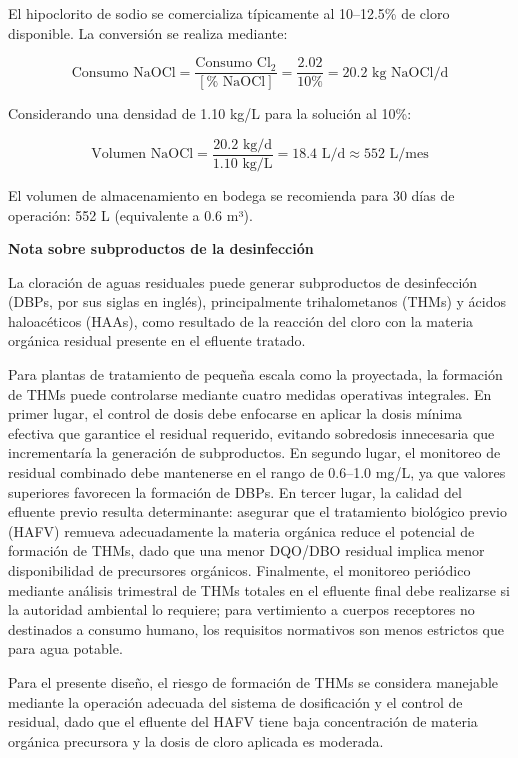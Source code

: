 \documentclass[12pt,a4paper]{article}
\begin{document}
El hipoclorito de sodio se comercializa típicamente al 10--12.5\% de cloro disponible. La conversión se realiza mediante:

\begin{equation}
\text{Consumo NaOCl} = \frac{\text{Consumo Cl}_2}{[\% \text{ NaOCl}]} = \frac{2.02}{10\%} = 20.2 \text{ kg NaOCl/d}
\end{equation}

Considerando una densidad de 1.10 kg/L para la solución al 10\%:

\begin{equation}
\text{Volumen NaOCl} = \frac{20.2 \text{ kg/d}}{1.10 \text{ kg/L}} = 18.4 \text{ L/d} \approx 552 \text{ L/mes}
\end{equation}

El volumen de almacenamiento en bodega se recomienda para 30 días de operación: 552 L (equivalente a 0.6 m³).

\textbf{Nota sobre subproductos de la desinfección}

La cloración de aguas residuales puede generar subproductos de desinfección (DBPs, por sus siglas en inglés), principalmente trihalometanos (THMs) y ácidos haloacéticos (HAAs), como resultado de la reacción del cloro con la materia orgánica residual presente en el efluente tratado.

Para plantas de tratamiento de pequeña escala como la proyectada, la formación de THMs puede controlarse mediante cuatro medidas operativas integrales. En primer lugar, el control de dosis debe enfocarse en aplicar la dosis mínima efectiva que garantice el residual requerido, evitando sobredosis innecesaria que incrementaría la generación de subproductos. En segundo lugar, el monitoreo de residual combinado debe mantenerse en el rango de 0.6--1.0 mg/L, ya que valores superiores favorecen la formación de DBPs. En tercer lugar, la calidad del efluente previo resulta determinante: asegurar que el tratamiento biológico previo (HAFV) remueva adecuadamente la materia orgánica reduce el potencial de formación de THMs, dado que una menor DQO/DBO residual implica menor disponibilidad de precursores orgánicos. Finalmente, el monitoreo periódico mediante análisis trimestral de THMs totales en el efluente final debe realizarse si la autoridad ambiental lo requiere; para vertimiento a cuerpos receptores no destinados a consumo humano, los requisitos normativos son menos estrictos que para agua potable.

Para el presente diseño, el riesgo de formación de THMs se considera manejable mediante la operación adecuada del sistema de dosificación y el control de residual, dado que el efluente del HAFV tiene baja concentración de materia orgánica precursora y la dosis de cloro aplicada es moderada.
\end{document}

